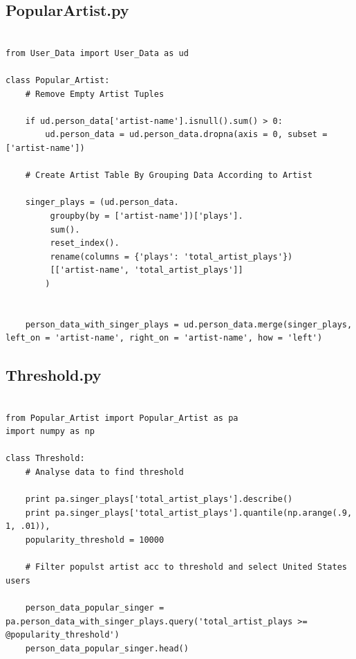 \documentclass[paper=a4, fontsize=12pt]{scrartcl}
\numberwithin{equation}{section}		%
\numberwithin{figure}{section}			%
\numberwithin{table}{section}				%
\begin{document}
\subsection{PopularArtist.py}
\scriptsize
\begin{lstlisting}

from User_Data import User_Data as ud

class Popular_Artist:
	# Remove Empty Artist Tuples

	if ud.person_data['artist-name'].isnull().sum() > 0:
	    ud.person_data = ud.person_data.dropna(axis = 0, subset = ['artist-name'])

	# Create Artist Table By Grouping Data According to Artist

	singer_plays = (ud.person_data.
	     groupby(by = ['artist-name'])['plays'].
	     sum().
	     reset_index().
	     rename(columns = {'plays': 'total_artist_plays'})
	     [['artist-name', 'total_artist_plays']]
	    )


	person_data_with_singer_plays = ud.person_data.merge(singer_plays, left_on = 'artist-name', right_on = 'artist-name', how = 'left')

\end{lstlisting}

\subsection{Threshold.py}
\scriptsize
\begin{lstlisting}

from Popular_Artist import Popular_Artist as pa
import numpy as np

class Threshold:
	# Analyse data to find threshold

	print pa.singer_plays['total_artist_plays'].describe()
	print pa.singer_plays['total_artist_plays'].quantile(np.arange(.9, 1, .01)), 
	popularity_threshold = 10000

	# Filter populst artist acc to threshold and select United States users

	person_data_popular_singer = pa.person_data_with_singer_plays.query('total_artist_plays >= @popularity_threshold')
	person_data_popular_singer.head()


\end{lstlisting}
\end{document}
